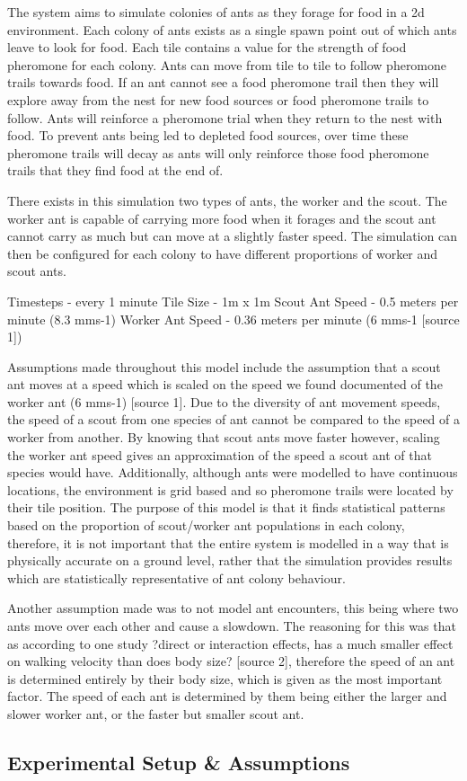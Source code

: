 The system aims to simulate colonies of ants as they forage for food in a 2d environment. Each colony of ants exists as a single spawn point out of which ants leave to look for food. Each tile contains a value for the strength of food pheromone for each colony. Ants can move from tile to tile to follow pheromone trails towards food. If an ant cannot see a food pheromone trail then they will explore away from the nest for new food sources or food pheromone trails to follow. Ants will reinforce a pheromone trial when they return to the nest with food. To prevent ants being led to depleted food sources, over time these pheromone trails will decay as ants will only reinforce those food pheromone trails that they find food at the end of. 

There exists in this simulation two types of ants, the worker and the scout. The worker ant is capable of carrying more food when it forages and the scout ant cannot carry as much but can move at a slightly faster speed. The simulation can then be configured for each colony to have different proportions of worker and scout ants. 

Timesteps - every 1 minute
Tile Size - 1m x 1m 
Scout Ant Speed - 0.5 meters per minute (8.3 mms-1)
Worker Ant Speed - 0.36 meters per minute (6 mms-1 [source 1]) 

Assumptions made throughout this model include the assumption that a scout ant moves at a speed which is scaled on the speed we found documented of the worker ant (6 mms-1) [source 1]. Due to the diversity of ant movement speeds, the speed of a scout from one species of ant cannot be compared to the speed of a worker from another. By knowing that scout ants move faster however, scaling the worker ant speed gives an approximation of the speed a scout ant of that species would have. Additionally, although ants were modelled to have continuous locations, the environment is grid based and so pheromone trails were located by their tile position. The purpose of this model is that it finds statistical patterns based on the proportion of scout/worker ant populations in each colony, therefore, it is not important that the entire system is modelled in a way that is physically accurate on a ground level, rather that the simulation provides results which are statistically representative of ant colony behaviour. 

Another assumption made was to not model ant encounters, this being where two ants move over each other and cause a slowdown. The reasoning for this was that as according to one study ?direct or interaction effects, has a much smaller effect on walking velocity than does body size? [source 2], therefore the speed of an ant is determined entirely by their body size, which is given as the most important factor. The speed of each ant is determined by them being either the larger and slower worker ant, or the faster but smaller scout ant.

 
 \subsection{Experimental Setup \& Assumptions}